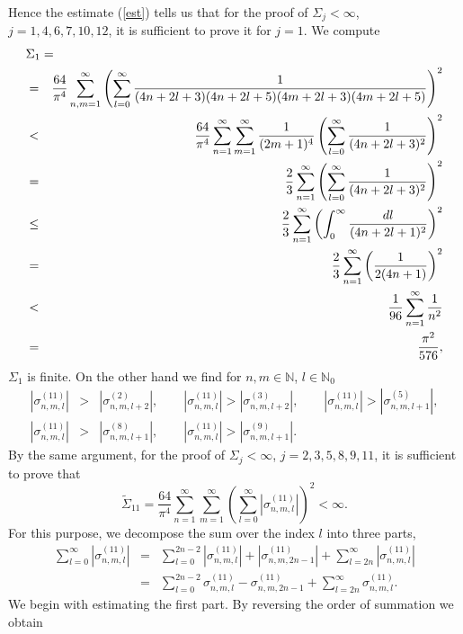 \documentclass[10pt,a4paper]{article}
\begin{document}
\begin{appendix}
Hence the estimate (\ref{est}) tells us that for
the proof of $\Sigma_j<\infty$, $j=1,4,6,7,10,12$,
it is sufficient to prove it for $j=1$. We compute
\begin{eqnarray*}
\lefteqn{\Sigma_1=}\\
&=& \frac{64}{\pi^4} \sum_{n,m=1}^\infty
\left( \sum_{l=0}^\infty
\frac{1}{(4n+2l+3)(4n+2l+5)(4m+2l+3)(4m+2l+5)}
\right)^2 \\
&<& \frac{64}{\pi^4} \sum_{n=1}^\infty
\sum_{m=1}^\infty \frac{1}{(2m+1)^4}
\left( \sum_{l=0}^\infty \frac{1}{(4n+2l+3)^2}
\right)^2 \\
&=& \frac{2}{3} \sum_{n=1}^\infty \left(
\sum_{l=0}^\infty \frac{1}{(4n+2l+3)^2}
\right)^2 \\
&\le& \frac{2}{3} \sum_{n=1}^\infty \left(
\int_0^\infty \frac{dl}{(4n+2l+1)^2} \right)^2 \\
&=& \frac{2}{3} \sum_{n=1}^\infty \left(
\frac{1}{2(4n+1)} \right)^2 \\
&<& \frac{1}{96} \sum_{n=1}^\infty \frac{1}{n^2} \\
&=& \frac{\pi^2}{576},
\end{eqnarray*}
$\Sigma_1$ is finite. On the other hand we find
for $n,m\in\mathbb{N}$, $l\in\mathbb{N}_0$
\begin{eqnarray*}
|\sigma_{n,m,l}^{(11)}| &>& |\sigma_{n,m,l+2}^{(2)}|,\qquad
|\sigma_{n,m,l}^{(11)}| > |\sigma_{n,m,l+2}^{(3)}|,\qquad
|\sigma_{n,m,l}^{(11)}| > |\sigma_{n,m,l+1}^{(5)}|,\\
|\sigma_{n,m,l}^{(11)}| &>& |\sigma_{n,m,l+1}^{(8)}|,\qquad
|\sigma_{n,m,l}^{(11)}| > |\sigma_{n,m,l+1}^{(9)}|.
\end{eqnarray*}
By the same argument, for the proof of
$\Sigma_j<\infty$, $j=2,3,5,8,9,11$, it is
sufficient to prove that
\[ \tilde{\Sigma}_{11} = \frac{64}{\pi^4} \sum_{n=1}^\infty
\sum_{m=1}^\infty \left( \sum_{l=0}^\infty
|\sigma_{n,m,l}^{(11)}| \right)^2 < \infty. \]
For this purpose, we decompose the sum over the index
$l$ into three parts,
\begin{eqnarray*}
\sum_{l=0}^\infty |\sigma_{n,m,l}^{(11)}| &=&
\sum_{l=0}^{2n-2} |\sigma_{n,m,l}^{(11)}| +
|\sigma_{n,m,2n-1}^{(11)}| + \sum_{l=2n}^\infty
|\sigma_{n,m,l}^{(11)}| \\ &=&
\sum_{l=0}^{2n-2} \sigma_{n,m,l}^{(11)} -
\sigma_{n,m,2n-1}^{(11)} + \sum_{l=2n}^\infty
\sigma_{n,m,l}^{(11)}.
\end{eqnarray*}
We begin with estimating the first part. By reversing
the order of summation we obtain
\begin{eqnarray*}

\end{eqnarray*}
\end{appendix}
\end{document}
